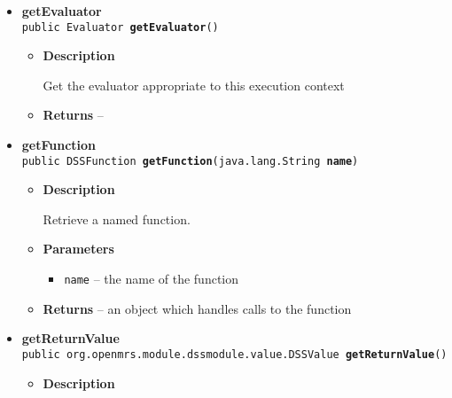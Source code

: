 {{{{\begin{itemize}
{\begin{itemize}
{Get the value of a variable associated with the specified name
}
\item{
{\bf  Parameters}
  \begin{itemize}
   \item{
\texttt{name} -- }
  \end{itemize}
}%
\item{{\bf  Returns} -- 
 
}%
\end{itemize}
}%
\item{ 
\hypertarget{org.openmrs.module.dssmodule.state.ExecutionContext.getEvaluator()}{{\bf  getEvaluator}\\}
\texttt{public Evaluator\ {\bf  getEvaluator}()
\label{org.openmrs.module.dssmodule.state.ExecutionContext.getEvaluator()}}%
\begin{itemize}
\item{
{\bf  Description}

Get the evaluator appropriate to this execution context
}
\item{{\bf  Returns} -- 
 
}%
\end{itemize}
}%
\item{ 
\hypertarget{org.openmrs.module.dssmodule.state.ExecutionContext.getFunction(java.lang.String)}{{\bf  getFunction}\\}
\texttt{public DSSFunction\ {\bf  getFunction}(\texttt{java.lang.String} {\bf  name})
\label{org.openmrs.module.dssmodule.state.ExecutionContext.getFunction(java.lang.String)}}%
\begin{itemize}
\item{
{\bf  Description}

Retrieve a named function.
}
\item{
{\bf  Parameters}
  \begin{itemize}
   \item{
\texttt{name} -- the name of the function}
  \end{itemize}
}%
\item{{\bf  Returns} -- 
an object which handles calls to the function 
}%
\end{itemize}
}%
\item{ 
\hypertarget{org.openmrs.module.dssmodule.state.ExecutionContext.getReturnValue()}{{\bf  getReturnValue}\\}
\texttt{public org.openmrs.module.dssmodule.value.DSSValue\ {\bf  getReturnValue}()
\label{org.openmrs.module.dssmodule.state.ExecutionContext.getReturnValue()}}%
\begin{itemize}
\item{
{\bf  Description}

}
\end{itemize}}
\end{itemize}}}}}
